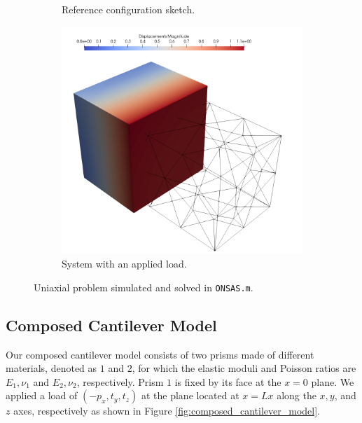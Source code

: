 \documentclass[oneside,a4paper,english,links]{amca}
\begin{document}
\begin{figure}[ht]
	\centering
	\begin{subfigure}[b]{0.48\textwidth}
	\def\svgwidth{\textwidth}
	
	\caption{Reference configuration sketch.}
	\end{subfigure}
	\hfill
	\begin{subfigure}[b]{0.48\textwidth}
	\centering
		\includegraphics[width=\textwidth]{Figures/Example1.png}
	\caption{System with an applied load.}
	\end{subfigure}
	\caption{Uniaxial problem simulated and solved in \texttt{ONSAS.m}.}
	\label{fig:uniaxial_model}
\end{figure}


\subsection{Composed Cantilever Model}
Our composed cantilever model consists of two prisms made of different materials, denoted as $1$ and $2$, for which the elastic moduli and Poisson ratios are $E_1, \nu_1$ and $E_2, \nu_2$, respectively. Prism $1$ is fixed by its face at the $x=0$ plane. We applied a load of $(-p_x, t_y, t_z)$ at the plane located at $x=Lx$ along the $x, y$, and $z$ axes, respectively as shown in Figure \ref{fig:composed_cantilever_model}.
\end{document}
